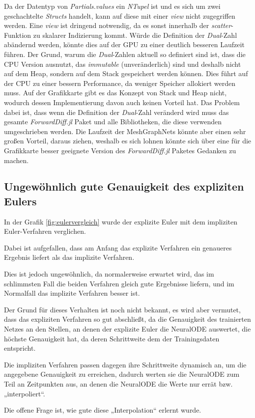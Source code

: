 Da der Datentyp von \textit{Partials.values} ein \textit{NTupel} ist und es sich um zwei geschachtelte 
\textit{Structs} handelt, kann auf diese mit einer \textit{view} nicht zugegriffen werden.
Eine \textit{view} ist dringend notwendig, da es sonst innerhalb der \textit{scatter}-Funktion 
zu skalarer Indizierung kommt.
Würde die Definition der \textit{Dual}-Zahl abändernd werden, könnte dies auf der 
GPU zu einer deutlich besseren Laufzeit führen.
Der Grund, warum die \textit{Dual}-Zahlen aktuell so definiert sind ist,
dass die CPU Version ausnutzt, das  \textit{immutable} (unveränderlich) sind und deshalb
nicht auf dem Heap, sondern auf dem Stack gespeichert werden können.
Dies führt auf der CPU zu einer bessern Performance, da weniger Speicher allokiert
werden muss.
Auf der Grafikkarte gibt es das Konzept von Stack und Heap nicht, wodurch dessen Implementierung
davon auch keinen Vorteil hat.
Das Problem dabei ist, dass wenn die Definition der \textit{Dual}-Zahl veränderd wird
muss das gesamte \textit{ForwardDiff.jl} Paket und alle Bibliotheken, die diese verwenden
umgeschrieben werden.
Die Laufzeit der MeshGraphNets könnte aber einen sehr großen Vorteil, daraus ziehen, weshalb 
es sich lohnen könnte sich über eine für die Grafikkarte besser geeignete Version des 
\textit{ForwardDiff.jl} Paketes Gedanken zu machen.



\subsection{Ungewöhnlich gute Genauigkeit des expliziten Eulers}

In der Grafik \ref{fig:eulervergleich} wurde der explizite Euler mit dem impliziten Euler-Verfahren verglichen.

Dabei ist aufgefallen, dass am Anfang das explizite Verfahren 
ein genaueres Ergebnis liefert als das implizite Verfahren.

Dies ist jedoch ungewöhnlich, da normalerweise erwartet wird, das im schlimmsten Fall die beiden Verfahren gleich gute Ergebnisse liefern,
und im Normalfall das implizite Verfahren besser ist.

Der Grund für dieses Verhalten ist noch nicht bekannt, es 
wird aber vermutet, dass das expliziten Verfahren so gut abschließt, 
da die Genauigkeit des trainierten Netzes an den Stellen, an denen der 
explizite Euler die NeuralODE auswertet, die höchste Genauigkeit hat,
da deren Schrittweite dem der Trainingsdaten entspricht.

Die impliziten Verfahren passen dagegen ihre Schrittweite dynamisch 
an, um die angegebene Genauigkeit zu erreichen, dadurch werten sie 
die NeuralODE zum Teil an Zeitpunkten aus, an denen die NeuralODE
die Werte nur errät bzw. „interpoliert“.

Die offene Frage ist, wie gute diese „Interpolation“ erlernt wurde.










